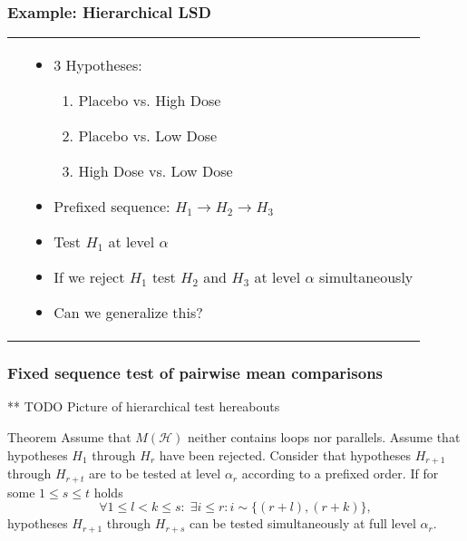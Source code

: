 \documentclass[bigger]{beamer}
\begin{document}
\begin{frame}
 \frametitle{Example: Hierarchical LSD}
\begin{tabular}{ll}
 \begin{minipage}{.4\textwidth}
   
 \end{minipage} &
 \begin{minipage}{.6\textwidth}
   \begin{itemize}
   \item 3 Hypotheses:
     \begin{enumerate}
     \item Placebo vs. High Dose
     \item Placebo vs. Low Dose
     \item High Dose vs. Low Dose
     \end{enumerate}
   \item Prefixed sequence: $H_1 \rightarrow H_2 \rightarrow H_3$
   \item Test $H_1$ at level $\alpha$
   \item If we reject $H_1$ test $H_2$ and $H_3$ at level $\alpha$
     simultaneously
   \item Can we generalize this?
   \end{itemize}
 \end{minipage}
\end{tabular}

\end{frame}

\begin{frame}
 \frametitle{Fixed sequence test of pairwise mean comparisons}

** TODO Picture of hierarchical test hereabouts


\begin{block}{Theorem}
 Assume that $M(\mathscr{H})$ neither contains loops nor
 parallels. Assume that hypotheses $H_1$ through $H_r$ have been
 rejected. Consider that hypotheses $H_{r+1}$ through $H_{r+t}$ are
 to be tested at level $\alpha_r$ according to a prefixed order.  If
 for some $1 \leq s \leq t$ holds
 \begin{equation}
   \label{eq:cond.hierarchical}
   \forall 1 \leq l < k \leq s: \; \exists i \leq r: i \sim \{(r+l),(r+k)\},
 \end{equation}
 hypotheses $H_{r+1}$ through $H_{r+s}$ can be tested simultaneously
 at full level $\alpha_r$.
\end{block}

\end{frame}
\end{document}
